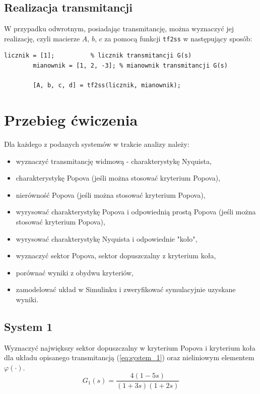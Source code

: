 \documentclass{article}
\begin{document}
    \subsection{Realizacja transmitancji}
    W przypadku odwrotnym, posiadając transmitancję, można wyznaczyć jej realizację, czyli macierze $A$, $b$, $c$ za pomocą funkcji \texttt{tf2ss} w następujący sposób:
    \begin{lstlisting}[style=Matlab-editor]
        licznik = [1];          % licznik transmitancji G(s)
        mianownik = [1, 2, -3]; % mianownik transmitancji G(s)
        
        [A, b, c, d] = tf2ss(licznik, mianownik);
    \end{lstlisting}


    

\section{Przebieg ćwiczenia}
Dla każdego z podanych systemów w trakcie analizy należy:
\begin{itemize}
    \item wyznaczyć transmitancję widmową - charakterystykę Nyquista,
    \item charakterystykę Popova (jeśli można stosować kryterium Popova),
    \item nierówność Popova (jeśli można stosować kryterium Popova),
    \item wyrysować charakterystykę Popova i odpowiednią prostą Popova (jeśli można stosować kryterium Popova),
    \item wyrysować charakterystykę Nyquista i odpowiednie "koło",
    \item wyznaczyć sektor Popova, sektor dopuszczalny z kryterium koła,
    \item porównać wyniki z obydwu kryteriów,
    \item zamodelować układ w Simulinku i zweryfikować symulacyjnie uzyskane wyniki. 
\end{itemize}

    \subsection{System 1}
    Wyznaczyć największy sektor dopuszczalny w kryterium Popova i kryterium koła dla układu opisanego transmitancją (\ref{eq:system_1}) oraz nieliniowym elementem $\varphi(\cdot)$.%
    \begin{equation}
        \label{eq:system_1}
        G_{1}(s) = \frac{4(1-5s)}{(1+3s)(1+2s)}
    \end{equation}
\end{document}
